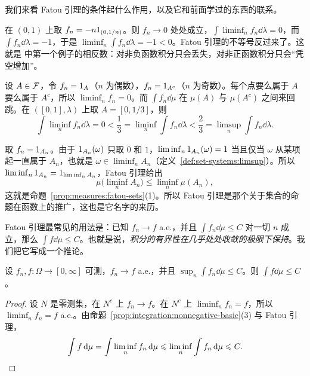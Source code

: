 我们来看 Fatou 引理的条件起什么作用，以及它和前面学过的东西的联系。

\begin{example}[非负性不能去掉]
在 $(0,1)$ 上取 $f_n=-n1_{(0,1/n)}$。则 $f_n\to0$ 处处成立，$\int\liminf_nf_n\dd\lambda=0$，而 $\int f_n\dd\lambda=-1$，于是 $\liminf_n\int f_n\dd\lambda=-1<0$。Fatou 引理的不等号反过来了。这就是 中第一个例子的相反数：对非负函数积分只会丢失，对非正函数积分只会“凭空增加”。
\end{example}

\begin{example}
设 $A\in\mathcal{F}$，令 $f_n=1_A$（$n$ 为偶数），$f_n=1_{A^c}$（$n$ 为奇数）。每个点要么属于 $A$ 要么属于 $A^c$，所以 $\liminf_nf_n=0$。而 $\int f_n\dd\mu$ 在 $\mu(A)$ 与 $\mu(A^c)$ 之间来回跳。在 $([0,1],\lambda)$ 上取 $A=[0,1/3]$，则
\[
\int\liminf_nf_n\dd\lambda=0<\frac13=\liminf_n\int f_n\dd\lambda<\frac23=\limsup_n\int f_n\dd\lambda .
\]
\end{example}

\begin{example}
取 $f_n=1_{A_n}$。由于 $1_{A_n}(\omega)$ 只取 $0$ 和 $1$，$\liminf_n1_{A_n}(\omega)=1$ 当且仅当 $\omega$ 从某项起一直属于 $A_n$，也就是 $\omega\in\liminf_nA_n$（定义~\ref{def:set-systems:limsup}）。所以 $\liminf_n1_{A_n}=1_{\liminf_nA_n}$，Fatou 引理给出
\[
\mu\bigl(\liminf_nA_n\bigr)\leqslant\liminf_n\mu(A_n),
\]
这就是命题~\ref{prop:measures:fatou-sets}(1)。所以 Fatou 引理是那个关于集合的命题在函数上的推广，这也是它名字的来历。
\end{example}

Fatou 引理最常见的用法是：已知 $f_n\to f$ a.e.，并且 $\int f_n\dd\mu\leqslant C$ 对一切 $n$ 成立，那么 $\int f\dd\mu\leqslant C$。也就是说，\emph{积分的有界性在几乎处处收敛的极限下保持}。我们把它写成一个推论。

\begin{corollary}\label{cor:integration:fatou-bound}
设 $f_n,f:\Omega\to[0,\infty]$ 可测，$f_n\to f$ a.e.，并且 $\sup_n\int f_n\dd\mu\leqslant C$。则 $\int f\dd\mu\leqslant C$。
\end{corollary}
\begin{proof}
设 $N$ 是零测集，在 $N^c$ 上 $f_n\to f$。在 $N^c$ 上 $\liminf_nf_n=f$，所以 $\liminf_nf_n=f$ a.e.。由命题~\ref{prop:integration:nonnegative-basic}(3) 与 Fatou 引理，
\[
\int f\,\mathrm{d}\mu=\int\liminf_nf_n\,\mathrm{d}\mu\leqslant\liminf_n\int f_n\,\mathrm{d}\mu\leqslant C .\qedhere
\]
\end{proof}

